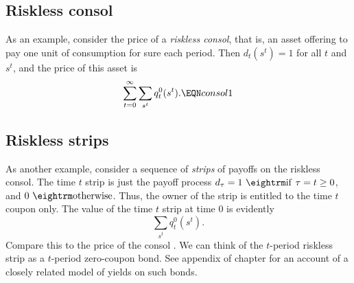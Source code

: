 \subsection{Riskless consol}
  As an example, consider the price of a {\it riskless consol}, that is,
an asset offering to pay one unit of consumption for sure
each period.  Then  $d_t(s^t) = 1$ for all $t$ and $s^t$, and the price
of this asset is
$$ \sum_{t=0}^\infty  \sum_{s^t} q_t^0(s^t) . \EQN consol1 $$


\subsection{Riskless strips}
  As another example, consider a  sequence of  {\it strips} of %
payoffs on the riskless consol.  The time $t$ strip is just the payoff
process $d_\tau = 1 \ {\rm if} \ \tau=t \geq 0$,
 and $0 \ {\rm otherwise}$.  Thus,
the owner of the strip is entitled  to the time $t$ coupon only.
The value of the time $t$ strip at time $0$ is evidently
$$ \sum_{s^t} q_t^0(s^t) .$$
Compare this to the price of the consol .  We can think of the $t$-period riskless strip as a
$t$-period zero-coupon bond. See appendix   of chapter  for an
account of a  closely related model of yields on such bonds.


